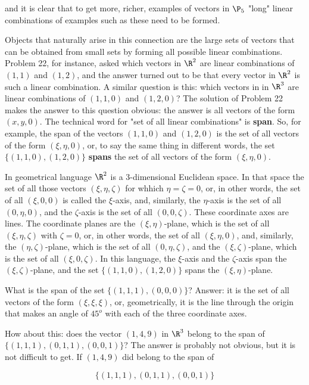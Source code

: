 and it is clear that to get more, richer, examples of vectors in $\P_5$ "long" linear combinations of examples such as these need to be formed.

Objects that naturally arise in this connection are the large sets of vectors that can be obtained from small sets by forming all possible linear combinations. Problem 22, for instance, asked which vectors in $\R^2$ are linear combinations of $(1,1)$ and $(1,2)$, and the answer turned out to be that every vector in $\R^2$ is such a linear combination. A similar question is this: which vectors in in $\R^3$ are linear combinations of $(1,1,0)$ and $(1,2,0)$? The solution of Problem 22 makes the answer to this question obvious: the answer is all vectors of the form $(x,y,0)$. The technical word for "set of all linear combinations" is \textbf{span}. So, for example, the span of the vectors $(1,1,0)$ and $(1,2,0)$ is the set of all vectors of the form $(\xi, \eta, 0)$, or, to say the same thing in different words, the set $\{(1,1,0), (1,2,0)\}$ \textbf{spans} the set of all vectors of the form $(\xi, \eta, 0)$.

In geometrical language $\R^2$ is a 3-dimensional Euclidean space. In that space the set of all those vectors $(\xi, \eta, \zeta)$ for whhich $\eta = \zeta = 0$, or, in other words, the set of all $(\xi, 0, 0)$ is called the $\xi$-axis, and, similarly, the $\eta$-axis is the set of all $(0,\eta, 0)$, and the $\zeta$-axis is the set of all $(0,0,\zeta)$. These coordinate axes are lines. The coordinate planes are the $(\xi, \eta)$-plane, which is the set of all $(\xi, \eta, \zeta)$ with $\zeta = 0$, or, in other words, the set of all $(\xi, \eta, 0)$, and, similarly, the $(\eta, \zeta)$-plane, which is the set of all $(0, \eta, \zeta)$, and the $(\xi, \zeta)$-plane, which is the set of all $(\xi, 0, \zeta)$. In this language, the $\xi$-axis and the $\zeta$-axis span the $(\xi, \zeta)$-plane, and the set $\{(1,1,0), (1,2,0)\}$ spans the $(\xi, \eta)$-plane.

What is the span of the set $\{(1,1,1),(0,0,0)\}$? Answer: it is the set of all vectors of the form $(\xi, \xi, \xi)$, or, geometrically, it is the line through the origin that makes an angle of $45^o$ with each of the three coordinate axes.

How about this: does the vector $(1,4,9)$ in $\R^3$ belong to the span of $\{(1,1,1), (0,1,1), (0,0,1)\}$? The answer is probably not obvious, but it is not difficult to get. If $(1,4,9)$ did belong to the span of

\begin{equation}
    \{(1,1,1), (0,1,1), (0,0,1)\}
\end{equation}

